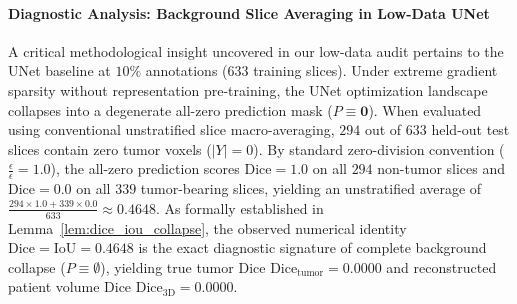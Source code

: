 \documentclass{article}
\begin{document}
\paragraph{Diagnostic Analysis: Background Slice Averaging in Low-Data UNet}
A critical methodological insight uncovered in our low-data audit pertains to the UNet baseline at $10\%$ annotations ($633$ training slices). Under extreme gradient sparsity without representation pre-training, the UNet optimization landscape collapses into a degenerate all-zero prediction mask ($P \equiv \mathbf{0}$). When evaluated using conventional unstratified slice macro-averaging, $294$ out of $633$ held-out test slices contain zero tumor voxels ($|Y| = 0$). By standard zero-division convention ($\frac{\epsilon}{\epsilon} = 1.0$), the all-zero prediction scores $\text{Dice} = 1.0$ on all $294$ non-tumor slices and $\text{Dice} = 0.0$ on all $339$ tumor-bearing slices, yielding an unstratified average of $\frac{294 \times 1.0 + 339 \times 0.0}{633} \approx 0.4648$. As formally established in Lemma~\ref{lem:dice_iou_collapse}, the observed numerical identity $\text{Dice} = \text{IoU} = 0.4648$ is the exact diagnostic signature of complete background collapse ($P \equiv \emptyset$), yielding true tumor Dice $\text{Dice}_{\text{tumor}} = 0.0000$ and reconstructed patient volume Dice $\text{Dice}_{\text{3D}} = 0.0000$.
\end{document}
